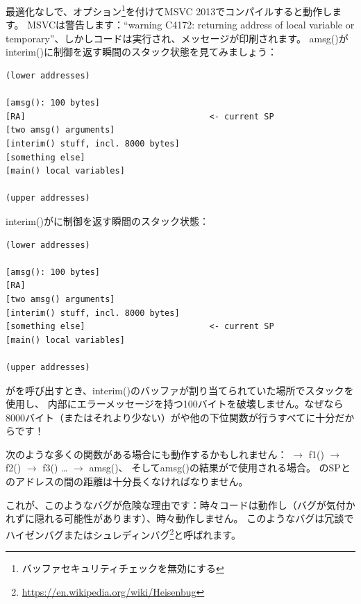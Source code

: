 最適化なしで、オプション\footnote{バッファセキュリティチェックを無効にする}を付けてMSVC 2013でコンパイルすると動作します。
MSVCは警告します：``warning C4172: returning address of local variable or temporary''、しかしコードは実行され、メッセージが印刷されます。
amsg()がinterim()に制御を返す瞬間のスタック状態を見てみましょう：

\begin{lstlisting}
(lower addresses)

[amsg(): 100 bytes]
[RA]                                     <- current SP
[two amsg() arguments]
[interim() stuff, incl. 8000 bytes]
[something else]
[main() local variables]

(upper addresses)
\end{lstlisting}

interim()が\main{}に制御を返す瞬間のスタック状態：

\begin{lstlisting}
(lower addresses)

[amsg(): 100 bytes]
[RA]
[two amsg() arguments]
[interim() stuff, incl. 8000 bytes]
[something else]                         <- current SP
[main() local variables]

(upper addresses)
\end{lstlisting}

\main{}が\printf{}を呼び出すとき、interim()のバッファが割り当てられていた場所でスタックを使用し、
内部にエラーメッセージを持つ100バイトを破壊しません。なぜなら8000バイト（またはそれより少ない）が\printf{}や他の下位関数が行うすべてに十分だからです！

次のような多くの関数がある場合にも動作するかもしれません：
\main{} $\rightarrow$ f1() $\rightarrow$ f2() $\rightarrow$ f3() \dots{} $\rightarrow$ amsg()、
そしてamsg()の結果が\main{}で使用される場合。
\main{}の\ac{SP}とのアドレスの間の距離は十分長くなければなりません。

これが、このようなバグが危険な理由です：時々コードは動作し（バグが気付かれずに隠れる可能性があります）、時々動作しません。
\label{heisenbug}
このようなバグは冗談でハイゼンバグまたはシュレディンバグ\footnote{\url{https://en.wikipedia.org/wiki/Heisenbug}}と呼ばれます。